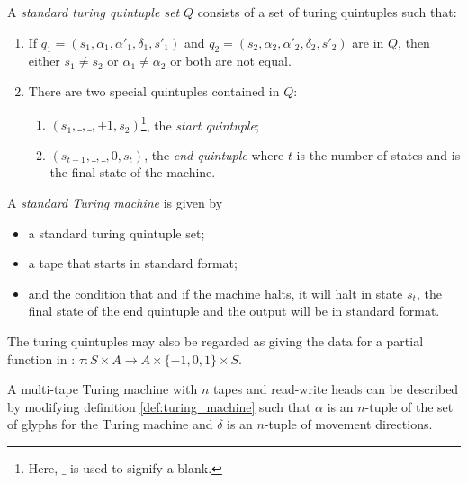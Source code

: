 \begin{definition}
  A \emph{standard turing quintuple set} $Q$ consists of a set of turing quintuples
  such that:
  \begin{enumerate}
    \item If $q_1 = (s_1,\alpha_1,\alpha'_1,\delta_1,s'_1)$ and
      $q_2 = (s_2,\alpha_2,\alpha'_2,\delta_2,s'_2)$ are in $Q$, then either
      $s_1 \ne s_2$ or $\alpha_1\ne \alpha_2$ or both are not equal.
    \item There are two special  quintuples contained in $Q$:
      \begin{enumerate}
        \item $(s_1,\_,\_,+1,s_2)$\footnote{Here, $\_$ is used to signify a blank.},
          the \emph{start quintuple};
        \item $(s_{t-1}, \_, \_, 0, s_{t})$, the \emph{end quintuple} where
        $t$ is the number of states and is the final state of the machine.
      \end{enumerate}
  \end{enumerate}
\end{definition}

\begin{definition}\label{def:turing_machine}
  A \emph{standard Turing machine} is given by
  \begin{itemize}
    \item a standard turing quintuple set;
    \item a tape that starts in standard format;
    \item and the condition that   and if the machine halts, it will halt in state
      $s_t$, the final state of the end quintuple and the output will be in standard format.
  \end{itemize}
\end{definition}

The turing quintuples may also be regarded as giving the data for a partial
function in \sets: $\tau:S\times A \to A\times\{-1,0,1\}\times S$.
\begin{remark}
  A multi-tape Turing machine with $n$ tapes and read-write heads
  can be described by modifying
  definition \ref{def:turing_machine} such that $\alpha$ is an $n$-tuple
  of the set of glyphs for the Turing machine and $\delta$ is an
  $n$-tuple of movement directions.
\end{remark}

